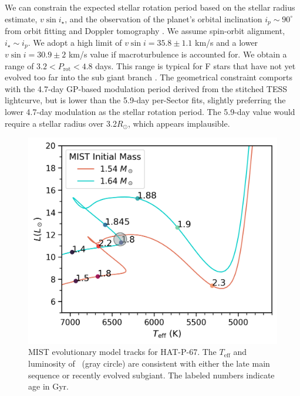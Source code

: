 \documentclass[twocolumn]{aastex631}
\newcommand{\hatp}{\object{HAT-P-67}~}
\begin{document}
We can constrain the expected stellar rotation period based on the stellar radius estimate, $v\sin{i_\star}$, and the observation of the planet's orbital inclination $i_p\sim90^\circ$ from orbit fitting and Doppler tomography \citep{2017AJ....153..211Z}.  We assume spin-orbit alignment, $i_\star \sim i_p$.  We adopt a high limit of $v\sin{i}=35.8\pm1.1$ km/s and a lower $v\sin{i}=30.9\pm2$ km/s value if macroturbulence is accounted for.  We obtain a range of $3.2 < P_\mathrm{rot}  < 4.8 $ days.  This range is typical for F stars that have not yet evolved too far into the sub giant branch \citep{2022ApJ...930....7A}.  The geometrical constraint comports with the 4.7-day GP-based modulation period derived from the stitched TESS lightcurve, but is lower than the 5.9-day per-Sector fits, slightly preferring the lower 4.7-day modulation as the stellar rotation period.  The 5.9-day value would require a stellar radius over 3.2$R_\odot$, which appears implausible.




\begin{figure}
    \centering
    \includegraphics[width=0.98\linewidth]{figures/MIST_only_HATP.png}
    \caption{MIST evolutionary model tracks for HAT-P-67.  The $T_\mathrm{eff}$ and luminosity of \hatp (gray circle) are consistent with either the late main sequence or recently evolved subgiant.  The labeled numbers indicate age in Gyr.}
    \label{fig:evolTracks}
\end{figure}
\end{document}
